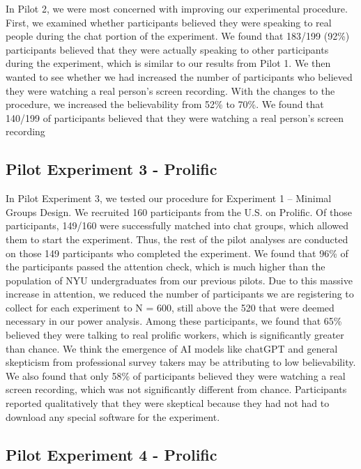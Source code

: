 \documentclass[12pt,]{article}
\begin{document}
In Pilot 2, we were most concerned with improving our experimental procedure. First, we examined whether participants believed they were speaking to real people during the chat portion of the experiment. We found that 183/199 (92\%) participants believed that they were actually speaking to other participants during the experiment, which is similar to our results from Pilot 1. We then wanted to see whether we had increased the number of participants who believed they were watching a real person’s screen recording. With the changes to the procedure, we increased the believability from 52\% to 70\%.  We found that 140/199 of participants believed that they were watching a real person’s screen recording
	
	
 \subsection{Pilot Experiment 3 - Prolific}
\label{appendix:px3}
In Pilot Experiment 3, we tested our procedure for Experiment 1 – Minimal Groups Design. We recruited 160 participants from the U.S. on Prolific. Of those participants, 149/160 were successfully matched into chat groups, which allowed them to start the experiment. Thus, the rest of the pilot analyses are conducted on those 149 participants who completed the experiment. We found that 96\% of the participants passed the attention check, which is much higher than the population of NYU undergraduates from our previous pilots. Due to this massive increase in attention, we reduced the number of participants we are registering to collect for each experiment to N = 600, still above the 520 that were deemed necessary in our power analysis.
Among these participants, we found that 65\% believed they were talking to real prolific workers, which is significantly greater than chance. We think the emergence of AI models like chatGPT and general skepticism from professional survey takers may be attributing to low believability. We also found that only 58\% of participants believed they were watching a real screen recording, which was not significantly different from chance. Participants reported qualitatively that they were skeptical because they had not had to download any special software for the experiment.

 \subsection{Pilot Experiment 4 - Prolific}
\label{appendix:px4}
\end{document}
